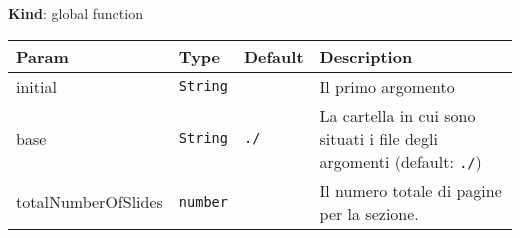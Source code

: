 \textbf{Kind}: global function

\begin{tabularx}{\textwidth}{XXXX}
\toprule
\begin{minipage}[b]{0.22\columnwidth}\raggedright
Param\strut
\end{minipage} & \begin{minipage}[b]{0.22\columnwidth}\raggedright
Type\strut
\end{minipage} & \begin{minipage}[b]{0.22\columnwidth}\raggedright
Default\strut
\end{minipage} & \begin{minipage}[b]{0.22\columnwidth}\raggedright
Description\strut
\end{minipage}\tabularnewline
\midrule
\endhead
\begin{minipage}[t]{0.22\columnwidth}\raggedright
initial\strut
\end{minipage} & \begin{minipage}[t]{0.22\columnwidth}\raggedright
\texttt{String}\strut
\end{minipage} & \begin{minipage}[t]{0.22\columnwidth}\raggedright
\strut
\end{minipage} & \begin{minipage}[t]{0.22\columnwidth}\raggedright
Il primo argomento\strut
\end{minipage}\tabularnewline
\begin{minipage}[t]{0.22\columnwidth}\raggedright
base\strut
\end{minipage} & \begin{minipage}[t]{0.22\columnwidth}\raggedright
\texttt{String}\strut
\end{minipage} & \begin{minipage}[t]{0.22\columnwidth}\raggedright
\texttt{./}\strut
\end{minipage} & \begin{minipage}[t]{0.22\columnwidth}\raggedright
La cartella in cui sono situati i file degli argomenti (default:
\texttt{./})\strut
\end{minipage}\tabularnewline
\begin{minipage}[t]{0.22\columnwidth}\raggedright
totalNumberOfSlides\strut
\end{minipage} & \begin{minipage}[t]{0.22\columnwidth}\raggedright
\texttt{number}\strut
\end{minipage} & \begin{minipage}[t]{0.22\columnwidth}\raggedright
\strut
\end{minipage} & \begin{minipage}[t]{0.22\columnwidth}\raggedright
Il numero totale di pagine per la sezione.\strut
\end{minipage}\tabularnewline
\bottomrule
\end{tabularx}

